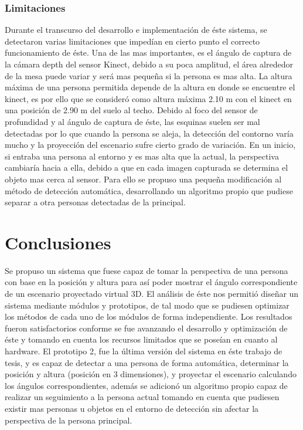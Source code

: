 \documentclass[a4paper,openright,12pt]{report}
\begin{document}
\subsection{Limitaciones}
Durante el transcurso del desarrollo e implementación de éste sistema, se detectaron varias limitaciones que impedían en cierto punto el correcto funcionamiento de éste. Una de las mas importantes, es el ángulo de captura de la cámara depth del sensor Kinect, debido a su poca amplitud, el área alrededor de la mesa puede variar y será mas pequeña si la persona es mas alta. La altura máxima de una persona permitida depende de la altura en donde se encuentre el kinect, es por ello que se consideró como altura máxima 2.10 m con el kinect en una posición de 2.90 m del suelo al techo. Debido al foco del sensor de profundidad y al ángulo de captura de éste, las esquinas suelen ser mal detectadas por lo que cuando la persona se aleja, la detección del contorno varía mucho y la proyección del escenario sufre cierto grado de variación. En un inicio, si entraba una persona al entorno y es mas alta que la actual, la perspectiva cambiaría hacia a ella, debido a que en cada imagen capturada se determina el objeto mas cerca al sensor. Para ello se propuso una pequeña modificación al método de detección automática, desarrollando un algoritmo propio que pudiese separar a otra personas detectadas de la principal.

\chapter{Conclusiones}\label{cap.conclusiones}
Se propuso un sistema que fuese capaz de tomar la perspectiva de una persona con base en la posición y altura para así poder mostrar el ángulo correspondiente de un escenario proyectado virtual 3D. El análisis de éste nos permitió diseñar un sistema mediante módulos y prototipos, de tal modo que se pudiesen optimizar los métodos de cada uno de los módulos de forma independiente. Los resultados fueron satisfactorios conforme se fue avanzando el desarrollo y optimización de éste y tomando en cuenta los recursos limitados que se poseían en cuanto al hardware. El prototipo 2, fue la última versión del sistema en éste trabajo de tesis, y es capaz de detectar a una persona de forma automática, determinar la posición y altura (posición en 3 dimensiones), y proyectar el escenario calculando los ángulos correspondientes, además se adicionó un algoritmo propio capaz de realizar un seguimiento a la persona actual tomando en cuenta que pudiesen existir mas personas u objetos en el entorno de detección sin afectar la perspectiva de la persona principal.
\end{document}
